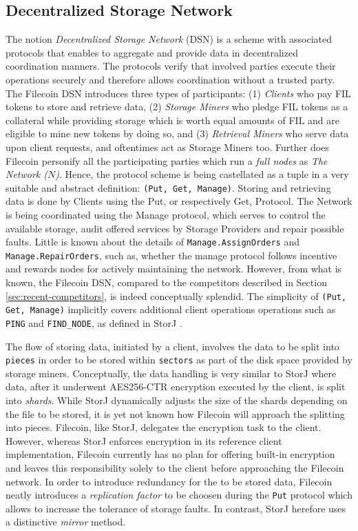 \documentclass[conference]{IEEEtran}
\begin{document}
\subsection{Decentralized Storage Network}
\label{subsec:dsn}
The notion \textit{Decentralized Storage Network} (DSN) is a scheme with associated protocols that enables to aggregate and provide data in decentralized coordination manners.
The protocols verify that involved parties execute their operations securely and therefore allows coordination without a trusted party.
The Filecoin DSN introduces three types of participants: (1) \textit{Clients} who pay FIL tokens to store and retrieve data, (2) \textit{Storage Miners} who pledge FIL tokens as a collateral while providing storage which is worth equal amounts of FIL and are eligible to mine new tokens by doing so, and (3) \textit{Retrieval Miners} who serve data upon client requests, and oftentimes act as Storage Miners too.
Further does Filecoin personify all the participating parties which run a \textit{full nodes} as \textit{The Network ($N$)}.
Hence, the protocol scheme is being castellated as a tuple in a very suitable and abstract definition: \texttt{(Put, Get, Manage)}.
Storing and retrieving data is done by Clients using the Put, or respectively Get, Protocol.
The Network is being coordinated using the Manage protocol, which serves to control the available storage, audit offered services by Storage Providers and repair possible faults.
Little is known about the details of \texttt{Manage.AssignOrders} and \texttt{Manage.RepairOrders}, such as, whether the manage protocol follows incentive and rewards nodes for actively maintaining the network.
However, from what is known, the Filecoin DSN, compared to the competitors described in Section \ref{sec:recent-competitors}, is indeed conceptually splendid.
The simplicity of \texttt{(Put, Get, Manage)} implicitly covers additional client operations operations such as \texttt{PING} and \texttt{FIND\_NODE}, as defined in StorJ \cite{storj}.

The flow of storing data, initiated by a client, involves the data to be split into \texttt{pieces} in order to be stored within \texttt{sectors} as part of the disk space provided by storage miners.
Conceptually, the data handling is very similar to StorJ\cite{storj} where data, after it underwent AES256-CTR encryption executed by the client, is split into \textit{shards}.
While StorJ dynamically adjusts the size of the shards depending on the file to be stored, it is yet not known how Filecoin will approach the splitting into pieces.
Filecoin, like StorJ, delegates the encryption task to the client.
However, whereas StorJ enforces encryption in its reference client implementation, Filecoin currently has no plan for offering built-in encryption and leaves this responsibility solely to the client before approaching the Filecoin network.
In order to introduce redundancy for the to be stored data, Filecoin neatly introduces a \textit{replication factor} to be choosen during the \texttt{Put} protocol which allows to increase the tolerance of storage faults.
In contrast, StorJ herefore uses a distinctive \textit{mirror} method.
\end{document}

